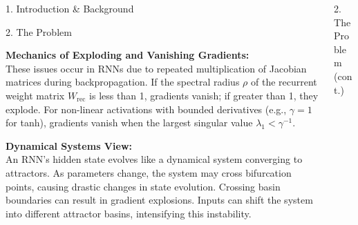 \begin{frame}[t]
\begin{columns}[t,totalwidth=\textwidth]
\begin{column}{0.3\textwidth}
\begin{block}{1. Introduction \& Background}
      \end{block}





      \begin{block}{2. The Problem}

    \textbf{Mechanics of Exploding and Vanishing Gradients:} \\
    These issues occur in RNNs due to repeated multiplication of Jacobian matrices during backpropagation. If the spectral radius $\rho$ of the recurrent weight matrix $W_{\text{rec}}$ is less than 1, gradients vanish; if greater than 1, they explode. For non-linear activations with bounded derivatives (e.g., $\gamma=1$ for tanh), gradients vanish when the largest singular value $\lambda_1 < \gamma^{-1}$.

    \vspace{0.5em}
    \textbf{Dynamical Systems View:} \\
    An RNN's hidden state evolves like a dynamical system converging to attractors. As parameters change, the system may cross bifurcation points, causing drastic changes in state evolution. Crossing basin boundaries can result in gradient explosions. Inputs can shift the system into different attractor basins, intensifying this instability.
    \end{block}
    \end{column}

\begin{column}{0.3\textwidth}
    \begin{block}{2. The Problem (cont.)}




\end{block}
\end{column}
\end{columns}
\end{frame}
